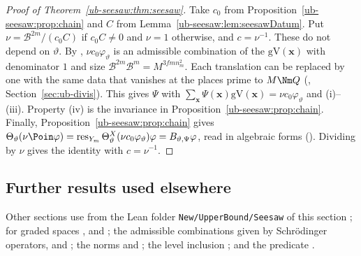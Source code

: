 \begin{proof}[Proof of Theorem~\ref{ub-seesaw:thm:seesaw}]
Take $c_0$ from Proposition~\ref{ub-seesaw:prop:chain} and $C$ from
Lemma~\ref{ub-seesaw:lem:seesawDatum}. Put $\nu=\mathcal B^{2m}/(c_0C)$ if $c_0C\neq0$ and $\nu=1$
otherwise, and $c=\nu^{-1}$. These do not depend on $\vartheta$. By
, $\nu c_0\varphi_\vartheta$ is an admissible
combination of the $\mathrm{gV}(\mathbf x)$ with denominator $1$ and size
$\mathcal B^{2m}\mathcal B^m=M^{3fmn_m^2}$. Each translation can be replaced by one with the same
data that vanishes at the places prime to $M\Nm Q$
(, Section~\ref{sec:ub-divis}). This gives
$\Psi$ with $\sum_{\mathbf x}\Psi(\mathbf x)\mathrm{gV}(\mathbf x)=\nu c_0\varphi_\vartheta$ and (i)--(iii). Property (iv) is
the invariance in Proposition~\ref{ub-seesaw:prop:chain}. Finally,
Proposition~\ref{ub-seesaw:prop:chain} gives
$\Theta_\vartheta(\nu\Poin\varphi)=\operatorname{res}_{Y_m}\Theta^X_\vartheta(\nu c_0\varphi_\vartheta)\varphi=B_{\vartheta,\Psi}\varphi$,
read in algebraic forms (). Dividing by $\nu$
gives the identity with $c=\nu^{-1}$.
\end{proof}

\subsection{Further results used elsewhere}\label{ub-seesaw:sec:further}

Other sections use from the Lean folder \texttt{New/UpperBound/Seesaw} of this section
; for graded spaces
,  and
; the admissible
combinations given by Schr\"odinger operators, 
and ; the norms
 and ;
the level inclusion ; and the predicate
.
